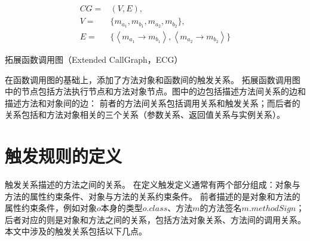 \begin{equation}
\begin{aligned}
CG = &(V,E) ,\\ 
V = & \{m_{a_{1}},m_{b_{1}},m_{a_{2}},m_{b_{2}}\}, \\ 
E = & \{  
\left\langle  m_{a_{1}} \to m_{b_{1}} \right\rangle  ,\left\langle  m_{a_{2}} \to m_{b_{2}}\right\rangle 
\} 
\end{aligned}
\label{equ:dcg_sample} 
\end{equation}



\begin{Def}
	拓展函数调用图（Extended CallGraph，ECG）
\end{Def}


	在函数调用图的基础上，添加了方法对象和函数间的触发关系。
	拓展函数调用图中的节点包括方法执行节点和方法对象节点。图中的边包括描述方法间关系的边和描述方法和对象间的边：
	前者的方法间关系包括调用关系和触发关系；而后者的关系包括和方法对象相关的三个关系（参数关系、返回值关系与实例关系）。
	
	
	
\section{触发规则的定义}

触发关系描述的方法之间的关系。
在定义触发定义通常有两个部分组成：对象与方法的属性约束条件、对象与方法的关系约束条件。
前者描述的是对象和方法的属性约束条件，例如对象$o$本身的类型$o.class$、方法$m$的方法签名$m.methodSign$；
后者对应的则是对象和方法之间的关系，包括方法对象关系、方法间的调用关系。
本文中涉及的触发关系包括以下几点。


